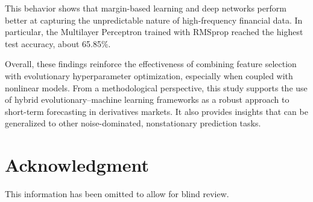 \documentclass[conference]{IEEEtran}
\begin{document}
This behavior shows that margin-based learning and deep networks perform better at capturing the unpredictable nature of high-frequency financial data. In particular, the Multilayer Perceptron trained with RMSprop reached the highest test accuracy, about 65.85\%.

Overall, these findings reinforce the effectiveness of combining feature selection with evolutionary hyperparameter optimization, especially when coupled with nonlinear models. From a methodological perspective, this study supports the use of hybrid evolutionary–machine learning frameworks as a robust approach to short-term forecasting in derivatives markets. It also provides insights that can be generalized to other noise-dominated, nonstationary prediction tasks.




\section*{Acknowledgment}
This information has been omitted to allow for blind
review.

\end{document}
